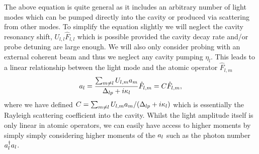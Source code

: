The above equation is quite general as it includes an arbitrary number
of light modes which can be pumped directly into the cavity or
produced via scattering from other modes. To simplify the equation
slightly we will neglect the cavity resonancy shift,
$U_{l,l} \hat{F}_{l,l}$ which is possible provided the cavity decay
rate and/or probe detuning are large enough. We will also only
consider probing with an external coherent beam and thus we neglect
any cavity pumping $\eta_l$. This leads to a linear relationship
between the light mode and the atomic operator $\hat{F}_{l,m}$
\begin{equation}
  a_l = \frac{\sum_{m \ne l} U_{l,m} a_m} 
  {\Delta_{lp} + i \kappa_l} \hat{F}_{l,m} = C \hat{F}_{l,m},
\end{equation}
where we have defined
$C = \sum_{m \ne l} U_{l,m} a_m / (\Delta_{lp} + i \kappa_l)$ which
is essentially the Rayleigh scattering coefficient into the
cavity. Whilst the light amplitude itself is only linear in atomic
operators, we can easily have access to higher moments by simply
simply considering higher moments of the $a_l$ such as the photon
number $a^\dagger_l a_l$.
